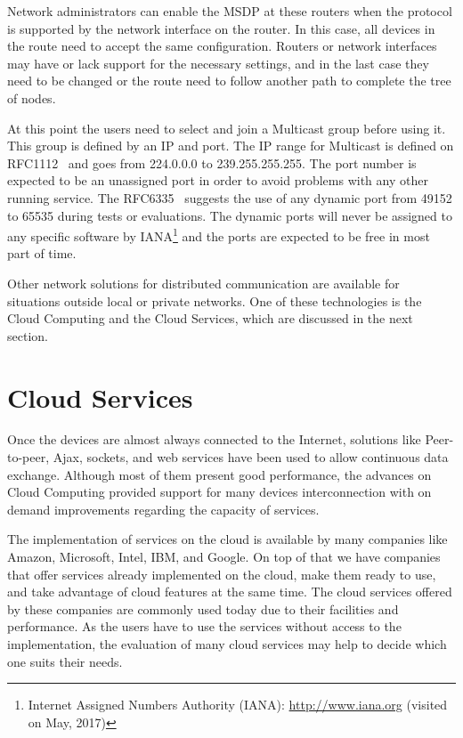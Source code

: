 Network administrators can enable the MSDP at these routers when the protocol is supported by the network interface on the router.
In this case, all devices in the route need to accept the same configuration.
Routers or network interfaces may have or lack support for the necessary settings, and in the last case they need to be changed or the route need to follow another path to complete the tree of nodes.    

At this point the users need to select and join a Multicast group before using it.
This group is defined by an IP and port.
The IP range for Multicast is defined on RFC1112~\citep{RFC1112Multicasting} and goes from 224.0.0.0 to 239.255.255.255.
The port number is expected to be an unassigned port in order to avoid problems with any other running service.
The RFC6335~\citep{RFC6335IANA} suggests the use of any dynamic port from 49152 to 65535 during tests or evaluations.
The dynamic ports will never be assigned to any specific software by IANA\footnote{Internet Assigned Numbers Authority (IANA): \url{http://www.iana.org} (visited on May, 2017)} and the ports are expected to be free in most part of time.

Other network solutions for distributed communication are available for situations outside local or private networks.
One of these technologies is the Cloud Computing and the Cloud Services, which are discussed in the next section.

\section{Cloud Services}
\label{sec:cloudservices}

Once the devices are almost always connected to the Internet, solutions like Peer-to-peer, Ajax, sockets, and web services have been used to allow continuous data exchange.
Although most of them present good performance, the advances on Cloud Computing provided support for many devices interconnection with on demand improvements regarding the capacity of services.

The implementation of services on the cloud is available by many companies like Amazon, Microsoft, Intel, IBM, and Google.
On top of that we have companies that offer services already implemented on the cloud, make them ready to use, and take advantage of cloud features at the same time.
The cloud services offered by these companies are commonly used today due to their facilities and performance.
As the users have to use the services without access to the implementation, the evaluation of many cloud services may help to decide which one suits their needs.

